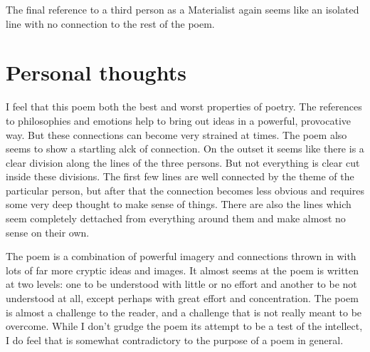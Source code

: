 \documentclass[11pt,letterpaper]{article}
\begin{document}
The final reference to a third person as a Materialist again seems like an isolated line with no connection to the rest of the poem.

\section*{Personal thoughts}
I feel that this poem both the best and worst properties of poetry. The references to philosophies and emotions help to bring out ideas in a powerful, provocative way. But these connections can become very strained at times. The poem also seems to show a startling alck of connection. On the outset it seems like there is a clear division along the lines of the three persons. But not everything is clear cut inside these divisions. The first few lines are well connected by the theme of the particular person, but after that the connection becomes less obvious and requires some very deep thought to make sense of things. There are also the lines which seem completely dettached from everything around them and make almost no sense on their own.

The poem is a combination of powerful imagery and connections thrown in with lots of far more cryptic ideas and images. It almost seems at the poem is written at two levels: one to be understood with little or no effort and another to be not understood at all, except perhaps with great effort and concentration. The poem is almost a challenge to the reader, and a challenge that is not really meant to be overcome. While I don't grudge the poem its attempt to be a test of the intellect, I do feel that is somewhat contradictory to the purpose of a poem in general. 


\end{document}
